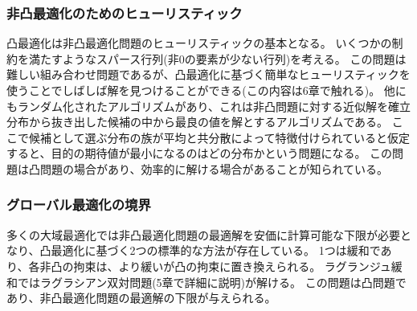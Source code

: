 \documentclass[a4paper, 10pt, uplatex]{jsreport}
\begin{document}
\subsubsection{非凸最適化のためのヒューリスティック}
凸最適化は非凸最適化問題のヒューリスティックの基本となる。
いくつかの制約を満たすようなスパース行列(非0の要素が少ない行列)を考える。
この問題は難しい組み合わせ問題であるが、凸最適化に基づく簡単なヒューリスティックを使うことでしばしば解を見つけることができる(この内容は6章で触れる)。
他にもランダム化されたアルゴリズムがあり、これは非凸問題に対する近似解を確立分布から抜き出した候補の中から最良の値を解とするアルゴリズムである。
ここで候補として選ぶ分布の族が平均と共分散によって特徴付けられていると仮定すると、目的の期待値が最小になるのはどの分布かという問題になる。
この問題は凸問題の場合があり、効率的に解ける場合があることが知られている。

\subsubsection{グローバル最適化の境界}
多くの大域最適化では非凸最適化問題の最適解を安価に計算可能な下限が必要となり、凸最適化に基づく2つの標準的な方法が存在している。
1つは緩和であり、各非凸の拘束は、より緩いが凸の拘束に置き換えられる。
ラグランジュ緩和ではラグラシアン双対問題(5章で詳細に説明)が解ける。
この問題は凸問題であり、非凸最適化問題の最適解の下限が与えられる。
\end{document}
